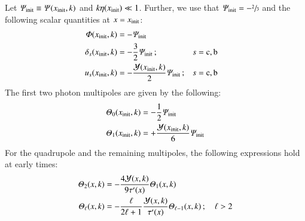 Let $\varPsi_\mathrm{init}\equiv\varPsi(x_\mathrm{init}, k)$ and $k\eta(x_\mathrm{init}) \ll 1$. Further, we use that $\varPsi_\mathrm{init}=-\sfrac{2}{3}$ and the following scalar quantities at $x=x_\mathrm{init}$:
\begin{subequations}\label{app:pert:eq:initial_conditions}
\begin{align}
    \varPhi(x_\mathrm{init}, k)     &= -\varPsi_\mathrm{init}                                 \label{app:pert:eq:init_Phi}\\
    \delta_s(x_\mathrm{init}, k) &= -\frac{3}{2} \varPsi_\mathrm{init}                   \,; &&s=\mathrm{c,b} \label{app:pert:eq:init_delta}\\
    u_s(x_\mathrm{init}, k)      &= -\frac{\mathcal{Y}(x_\mathrm{init}, k)}{2} \varPsi_\mathrm{init}\,; &&s=\mathrm{c,b} \label{app:pert:eq:init_u}
\end{align}
\end{subequations}
The first two photon multipoles are given by the following:
\begin{subequations}\label{app:pert:eq:initial_conditions_Theta01}
\begin{align}
    \varTheta_0(x_\mathrm{init}, k) &= -\frac{1}{2}\varPsi_\mathrm{init}        \label{app:pert:eq:init_Theta0}\\
    \varTheta_1(x_\mathrm{init}, k) &= +\frac{\mathcal{Y}(x_\mathrm{init}, k)}{6}\varPsi_\mathrm{init}     \label{app:pert:eq:init_Theta1}
\end{align}
\end{subequations}
For the quadrupole and the remaining multipoles, the following expressions hold at early times:
\begin{subequations}\label{app:pert:eq:initial_conditions_Theta2ell}
\begin{align}
    \varTheta_2(x, k) &= -\frac{4\mathcal{Y}(x, k)}{9\tau'(x)}\varTheta_{1}(x, k)\label{app:pert:eq:init_Theta2} \\
    \varTheta_\ell(x, k) &= -\frac{\ell}{2\ell+1} \frac{\mathcal{Y}(x, k)}{\tau'(x)} \varTheta_{\ell-1}(x, k)\,; \quad \ell > 2 \label{app:pert:eq:init_Thetaell}
\end{align}
\end{subequations}












